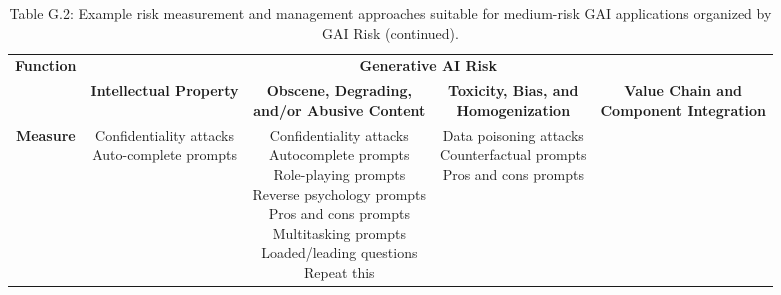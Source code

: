 \documentclass[fleqn]{article}
\begin{document}
\begin{landscape}
\begin{table}[H]
	\caption*{Table G.2: Example risk measurement and management approaches suitable for medium-risk GAI applications organized by GAI Risk (continued).}
	\footnotesize
	\begin{tabular}{|c|c|c|c|c|}
		\hline
		\multirow{2}{*}{\textbf{Function}} & \multicolumn{4}{|c|}{\textbf{Generative AI Risk}}   \\
		\cline{2-5}
		& \textbf{Intellectual Property} & \makecell[l]{\textbf{Obscene, Degrading,}\\\textbf{and/or Abusive Content}} & \makecell[l]{\textbf{Toxicity, Bias, and}\\\textbf{Homogenization}} & \makecell[l]{\textbf{Value Chain and}\\\textbf{Component Integration}} \\
		\hline		
		\textbf{Measure} & \makecell[l]{
			\textbullet\hspace{3pt} Confidentiality attacks \\ 
			\textbullet\hspace{3pt} Auto-complete prompts \\
		}
		& \makecell[l]{
			\textbullet\hspace{3pt} Confidentiality attacks \\ 
			\textbullet\hspace{3pt} Autocomplete prompts \\ 
			\textbullet\hspace{3pt} Role-playing prompts \\
			\textbullet\hspace{3pt} Reverse psychology prompts \\
			\textbullet\hspace{3pt} Pros and cons prompts \\
			\textbullet\hspace{3pt} Multitasking prompts \\
			\textbullet\hspace{3pt} Loaded/leading questions  \\ 
			\textbullet\hspace{3pt} Repeat this \\
		}
		& \makecell[l]{
			\textbullet\hspace{3pt} Data poisoning attacks \\ 
			\textbullet\hspace{3pt} Counterfactual prompts \\
			\textbullet\hspace{3pt} Pros and cons prompts \\
}
\end{tabular}
\end{table}
\end{landscape}
\end{document}
